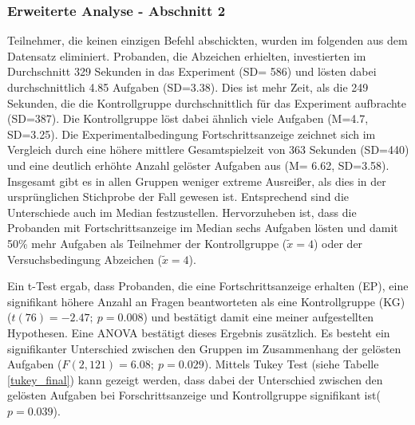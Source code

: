 \subsubsection{Erweiterte Analyse - Abschnitt 2}
Teilnehmer, die keinen einzigen Befehl abschickten, wurden im folgenden aus dem Datensatz eliminiert.
Probanden, die Abzeichen erhielten, investierten im Durchschnitt 329 Sekunden in das Experiment (SD= 586) und lösten dabei durchschnittlich 4.85 Aufgaben (SD=3.38). Dies ist mehr Zeit, als die 249 Sekunden, die die Kontrollgruppe durchschnittlich für das Experiment aufbrachte (SD=387). Die Kontrollgruppe löst dabei ähnlich viele Aufgaben (M=4.7, SD=3.25). Die Experimentalbedingung Fortschrittsanzeige zeichnet sich im Vergleich durch eine höhere mittlere Gesamtspielzeit von 363 Sekunden (SD=440) und eine deutlich erhöhte Anzahl gelöster Aufgaben aus (M= 6.62, SD=3.58). Insgesamt gibt es in allen Gruppen weniger extreme Ausreißer, als dies in der ursprünglichen Stichprobe der Fall gewesen ist. Entsprechend sind die Unterschiede auch im Median festzustellen. Hervorzuheben ist, dass die Probanden mit Fortschrittsanzeige im Median sechs Aufgaben lösten und damit 50\% mehr Aufgaben als Teilnehmer der Kontrollgruppe ($\tilde x = 4$) oder der Versuchsbedingung Abzeichen ($\tilde x = 4$).

Ein t-Test ergab, dass Probanden, die eine Fortschrittsanzeige erhalten (EP), eine signifikant höhere Anzahl an Fragen beantworteten als eine Kontrollgruppe (KG) ($t(76)=-2.47;\: p=0.008$) und bestätigt damit eine meiner aufgestellten Hypothesen. Eine ANOVA bestätigt dieses Ergebnis zusätzlich. Es besteht ein signifikanter Unterschied zwischen den Gruppen im Zusammenhang der gelösten Aufgaben ($F(2,121)=6.08;\: p=0.029$). Mittels Tukey Test (siehe Tabelle \ref{tukey_final}) kann gezeigt werden, dass dabei der Unterschied zwischen den gelösten Aufgaben bei Forschrittsanzeige und Kontrollgruppe signifikant ist($p=0.039$).

